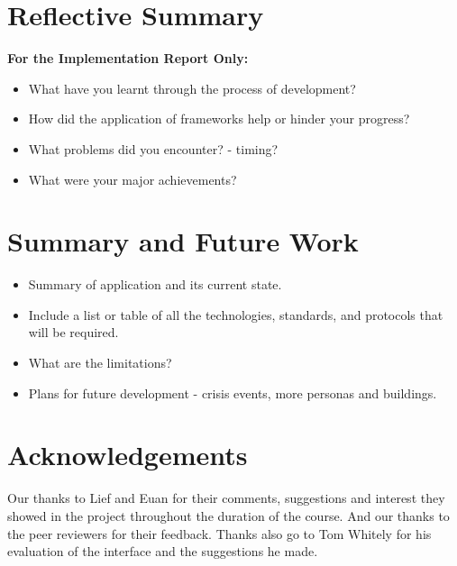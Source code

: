 \documentclass{sig-alt-release2}
\begin{document}
\section{Reflective Summary}
{\bf For the Implementation Report Only:}
\begin{itemize}

\item	What have you learnt through the process of development? 

\item	How did the application of frameworks help or hinder your progress? 

\item	What problems did you encounter? - timing?

\item	What were your major achievements?
\end{itemize}

\section{Summary and Future Work}
\begin{itemize}

\item	Summary of application and its current state.

\item	Include a list or table of all the technologies, standards, and protocols that will be required.

\item	What are the limitations?

\item Plans for future development - crisis events, more personas and buildings.

\end{itemize}

\section{Acknowledgements}
Our thanks to Lief and Euan for their comments, suggestions and interest they showed in the project throughout the duration of the course. And our thanks to the peer reviewers for their feedback.
Thanks also go to Tom Whitely for his evaluation of the interface and the suggestions he made.



\end{document}
